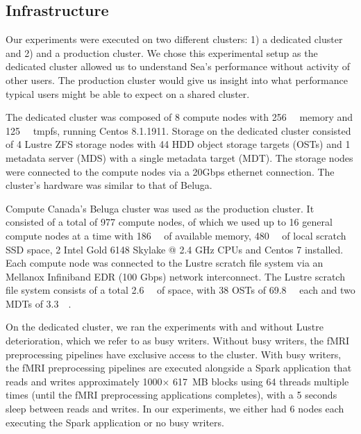     
    \subsection{Infrastructure}
    
    Our experiments were executed on two different clusters: 1) a dedicated cluster
    and 2) and a production cluster. We chose this experimental setup as the dedicated
    cluster allowed us to understand Sea's performance without activity of other users.
    The production cluster would give us insight into what performance typical users might
    be able to expect on a shared cluster.

    The dedicated cluster was composed of 8
    compute nodes with \SI{256}{\gibi\byte} memory and \SI{125}{\gibi\byte}
    tmpfs, running Centos 8.1.1911.
    Storage on the dedicated cluster consisted of 4 Lustre ZFS storage nodes with 44
    HDD object storage targets (OSTs) and 1 metadata server  (MDS) with a single
    metadata target (MDT). The storage nodes were connected to the compute nodes
    via a 20Gbps ethernet connection. The cluster's hardware was similar to that
    of Beluga.
    
    Compute Canada's Beluga cluster was used as the production cluster. It consisted of a total of 977 compute nodes, of which we
    used up to 16 general compute nodes at a time with \SI{186}{\gibi\byte} of
    available memory, \SI{480}{\gibi\byte} of local scratch SSD space, 2 Intel
    Gold 6148 Skylake @ 2.4 GHz CPUs and Centos 7 installed. Each compute node
    was connected to the Lustre scratch file system via an Mellanox Infiniband
    EDR (100 Gbps) network interconnect. The Lustre scratch file system consists
    of a total \SI{2.6}{\pebi\byte} of space, with 38 OSTs of
    \SI{69.8}{\tebi\byte} each and two MDTs of \SI{3.3}{\tebi\byte}.

    On the dedicated cluster, we ran the experiments with and without
    Lustre deterioration, which we refer to as busy writers. Without busy
    writers, the fMRI preprocessing pipelines have exclusive access to the
    cluster. With busy writers, the fMRI preprocessing pipelines are executed
    alongside a Spark application that reads and writes approximately
    1000$\times$ 617~MB blocks using 64 threads multiple times (until the fMRI
    preprocessing applications completes), with a 5 seconds sleep between reads
    and writes. In our experiments, we either had 6 nodes each executing the
    Spark application or no busy writers.

